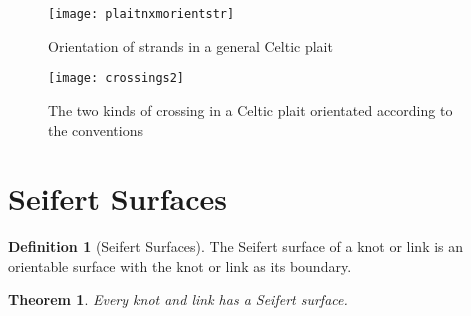 \documentclass[10pt,a4paper]{report}
\newtheorem{theorem}{Theorem}[section]
\theoremstyle{definition}
\newtheorem{definition}{Definition}[section]
\theoremstyle{remark}
\theoremstyle{example}
\begin{document}
\begin{figure}[H]
\centering
\graphicspath{{/Users/Imogen/Desktop/seifertimages/lapath/}}
\texttt{[image: plaitnxmorientstr]}
\caption{Orientation of strands in a general Celtic plait}
\label{plaitnxmorientstr}
\end{figure}

\begin{figure}[H]
\centering
\graphicspath{{/Users/Imogen/Desktop/seifertimages/lapath/}}
\texttt{[image: crossings2]}
\caption{The two kinds of crossing in a Celtic plait orientated according to the conventions}
\label{crossings2}
\end{figure}
 
\section{Seifert Surfaces}
\begin{definition}[Seifert Surfaces]

The Seifert surface of a knot or link is an orientable surface with the knot or link as its boundary.
\end{definition}

\begin{theorem}
 Every knot and link has a Seifert surface.
\label{thm1}
\end{theorem}
\end{document}
